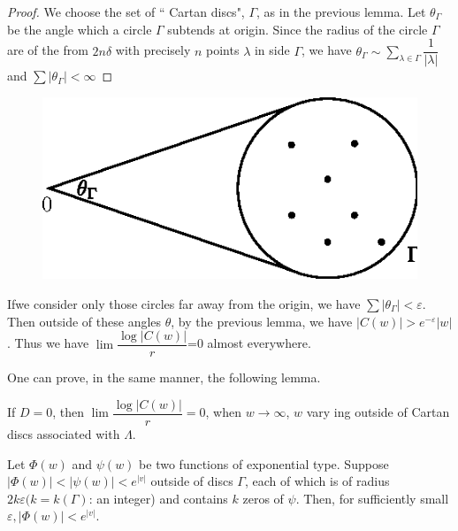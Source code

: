 \begin{proof}
 We choose the set of `` Cartan discs", $\Gamma$, as in the previous
 lemma. Let $\theta_\Gamma$ be the angle which a circle $\Gamma$
 subtends at origin. Since the radius of the circle $\Gamma$ are of
 the from $2 n \delta$ with precisely $n$ points $\lambda$ in side
 $\Gamma$, we have $\theta_\Gamma \sim \sum\limits_{\lambda
 \in \Gamma} \dfrac{1}{|\lambda|}$ and $ \sum
 |\theta_\Gamma| < \infty$ 
\end{proof}

\begin{figure}[H]
\centerline{\includegraphics{vol15-figures/fig15-11.eps}}
\end{figure}

If\pageoriginale we consider only those circles far away from the origin, we have
$\sum |\theta_\Gamma| < \varepsilon$. Then outside of these angles
$\theta $, by the previous lemma, we have $|C (w)| > e^{-
 \varepsilon} |w|$. Thus we have $\lim \dfrac{\log |C (w)|} {r}$=0
almost everywhere. 

One can prove, in the same manner, the following lemma. 

\begin{lem}\label{chap14:lem5}
 If $D = 0$, then $\lim \dfrac{\log |C (w)|} {r} = 0$, when $ w \to
 \infty$, $w$ vary ing outside of Cartan discs associated with
 $\Lambda$. 
\end{lem}

\begin{lem}\label{chap14:lem6}
 Let $\Phi (w)$ and $\psi (w)$ be two functions of exponential
 type. Suppose $|\Phi (w)| < |\psi (w)| < e^{|v|}$ outside of discs
 $\Gamma$, each of which is of radius $2 k \varepsilon (k = k (\Gamma)$:
 an integer) and contains $k$ zeros of $\psi$. Then, for sufficiently
 small $\varepsilon, |\Phi (w)| < e^{|v|}$. 
\end{lem}

